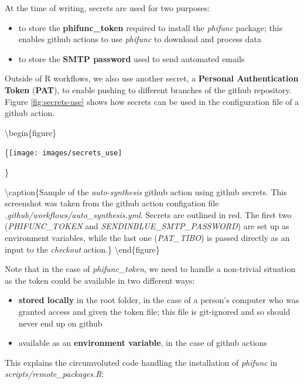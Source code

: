 \documentclass[]{book}
\providecommand{\tightlist}{%
  \setlength{\itemsep}{0pt}\setlength{\parskip}{0pt}}
\begin{document}
At the time of writing, secrets are used for two purposes:

\begin{itemize}
\tightlist
\item
  to store the \textbf{phifunc\_token} required to install the \emph{phifunc} package; this
  enables github actions to use \emph{phifunc} to download and process data
\item
  to store the \textbf{SMTP password} used to send automated emails
\end{itemize}

Outside of R workflows, we also use another secret, a \textbf{Personal Authentication
Token} (\textbf{PAT}), to enable pushing to different branches of the github
repository. Figure \ref{fig:secrets-use} shows how secrets can be used in the
configuration file of a github action.

\textbackslash{}begin\{figure\}

\{\centering \texttt{[image: images/secrets\_use]}

\}

\textbackslash{}caption\{Sample of the \emph{auto-synthesis} github action using github secrets. This screenshot was taken from the github action configation file \emph{.github/workflows/auto\_synthesis.yml}. Secrets are outlined in red. The first two (\emph{PHIFUNC\_TOKEN} and \emph{SENDINBLUE\_SMTP\_PASSWORD}) are set up as environment variables, while the last one (\emph{PAT\_TIBO}) is passed directly as an input to the \emph{checkout} action.\}\label{fig:secrets-use}
\textbackslash{}end\{figure\}

Note that in the case of \emph{phifunc\_token}, we need to handle a non-trivial
situation as the token could be available in two different ways:

\begin{itemize}
\tightlist
\item
  \textbf{stored locally} in the root folder, in the case of a person's computer who was
  granted access and given the token file; this file is git-ignored and so
  should never end up on github
\item
  available as an \textbf{environment variable}, in the case of github actions
\end{itemize}

This explains the circumvoluted code handling the installation of \emph{phifunc} in
\emph{scripts/remote\_packages.R}:
\end{document}
